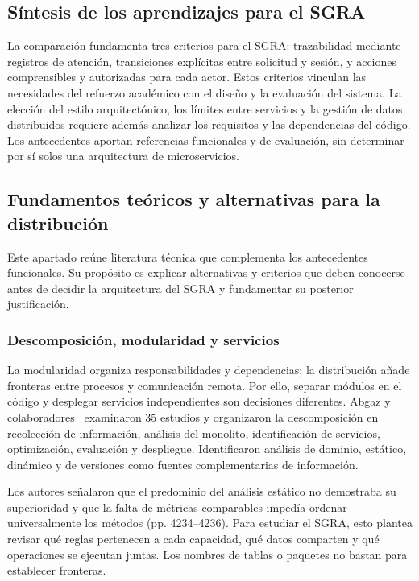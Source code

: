 \subsection{Síntesis de los aprendizajes para el SGRA}

La comparación fundamenta tres criterios para el SGRA: trazabilidad mediante registros de atención, transiciones explícitas entre solicitud y sesión, y acciones comprensibles y autorizadas para cada actor. Estos criterios vinculan las necesidades del refuerzo académico con el diseño y la evaluación del sistema. La elección del estilo arquitectónico, los límites entre servicios y la gestión de datos distribuidos requiere además analizar los requisitos y las dependencias del código. Los antecedentes aportan referencias funcionales y de evaluación, sin determinar por sí solos una arquitectura de microservicios.

\subsection{Fundamentos teóricos y alternativas para la distribución}
\label{sec:fundamentos-distribucion}
Este apartado reúne literatura técnica que complementa los antecedentes funcionales. Su propósito es explicar alternativas y criterios que deben conocerse antes de decidir la arquitectura del SGRA y fundamentar su posterior justificación.

\subsubsection{Descomposición, modularidad y servicios}
La modularidad organiza responsabilidades y dependencias; la distribución añade fronteras entre procesos y comunicación remota. Por ello, separar módulos en el código y desplegar servicios independientes son decisiones diferentes. Abgaz y colaboradores~\cite{abgaz2023-decomposition} examinaron 35 estudios y organizaron la descomposición en recolección de información, análisis del monolito, identificación de servicios, optimización, evaluación y despliegue. Identificaron análisis de dominio, estático, dinámico y de versiones como fuentes complementarias de información.

Los autores señalaron que el predominio del análisis estático no demostraba su superioridad y que la falta de métricas comparables impedía ordenar universalmente los métodos (pp. 4234--4236). Para estudiar el SGRA, esto plantea revisar qué reglas pertenecen a cada capacidad, qué datos comparten y qué operaciones se ejecutan juntas. Los nombres de tablas o paquetes no bastan para establecer fronteras.

